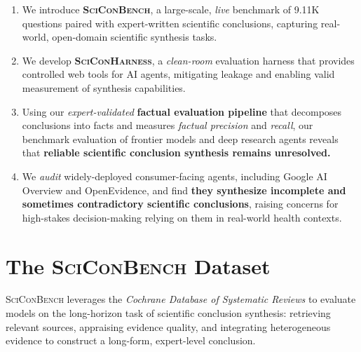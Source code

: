 \documentclass{article}
\begin{document}
\vspace{-1mm}
\begin{enumerate}[leftmargin=1.5em]
    \item We introduce \textbf{\textsc{SciConBench}}, a large-scale, \textit{live} benchmark of 9.11K questions paired with expert-written scientific conclusions, capturing real-world, open-domain scientific synthesis tasks.
    
    \item We develop \textbf{\textsc{SciConHarness}}, a \textit{clean-room} evaluation harness that provides controlled web tools for AI agents, mitigating leakage and enabling valid measurement of synthesis capabilities. 
    
    \item Using our \textit{expert-validated} \textbf{factual evaluation pipeline} that decomposes conclusions into facts and measures \textit{factual precision} and \textit{recall}, our benchmark evaluation of frontier models and deep research agents reveals that \textbf{reliable scientific conclusion synthesis remains unresolved.}
    
    \item We \textit{audit} widely-deployed consumer-facing agents, including Google AI Overview and OpenEvidence, and find \textbf{they synthesize incomplete and sometimes contradictory scientific conclusions}, raising concerns for high-stakes decision-making relying on them in real-world health contexts.    
\end{enumerate}





\section{The \textsc{SciConBench} Dataset}\label{sec:sciconbench}

\textsc{SciConBench} leverages the \textit{Cochrane Database of Systematic Reviews} to evaluate models on the long-horizon task of scientific conclusion synthesis: retrieving relevant sources, appraising evidence quality, and integrating heterogeneous evidence to construct a long-form, expert-level conclusion. 
\end{document}
